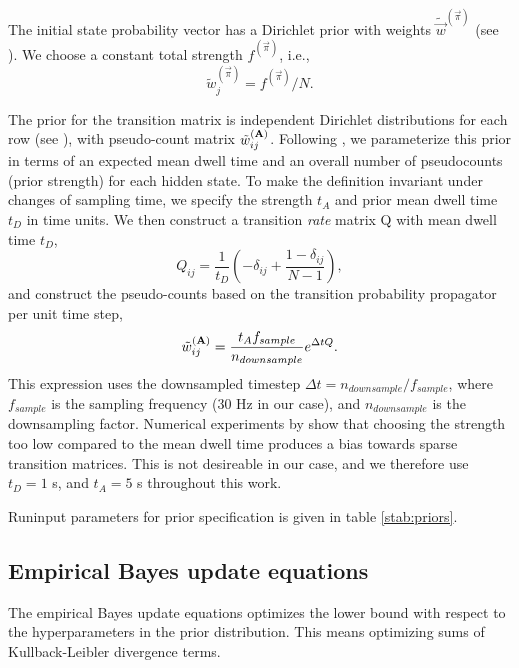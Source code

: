 The initial state probability vector has a Dirichlet prior with
weights $\tilde\vec w^{(\vec{\pi})}$ (see ). We choose a
constant total strength $f^{(\vec\pi)}$, i.e.,
\begin{equation}
  \tilde w_j^{(\vec{\pi})}=f^{(\vec\pi)}/N.
\end{equation}

The prior for the transition matrix is independent Dirichlet
distributions for each row (see ), with pseudo-count
matrix $\tilde w_{ij}^{(\mathbf{A})}$. Following \citet{persson2013},
we parameterize this prior in terms of an expected mean dwell time and
an overall number of pseudocounts (prior strength) for each hidden
state. To make the definition invariant under changes of sampling
time, we specify the strength $t_A$ and prior mean dwell time $t_D$ in
time units. We then construct a transition \textit{rate} matrix Q with
mean dwell time $t_D$,
\begin{equation}
  Q_{ij}=\frac{1}{t_D}\left(-\delta_{ij}
  +\frac{1-\delta_{ij}}{N-1}\right),
\end{equation}
and construct the pseudo-counts based on the transition probability
propagator per unit time step,
\begin{equation}
  \tilde w_{ij}^{(\mathbf{A})}=\frac{t_Af_{sample}}{n_{downsample}}
  e^{\Delta tQ}.
\end{equation}
This expression uses the downsampled timestep $\Delta
t=n_{downsample}/f_{sample}$, where $f_{sample}$ is the sampling
frequency (30 Hz in our case), and $n_{downsample}$ is the
downsampling factor.  Numerical experiments by \citet{persson2013}
show that choosing the strength too low compared to the mean dwell
time produces a bias towards sparse transition matrices. This is not
desireable in our case, and we therefore use $t_D=1$ s, and $t_A=5$ s
throughout this work.

Runinput parameters for prior specification is given in table
\ref{stab:priors}.

\subsection{Empirical Bayes update equations}
The empirical Bayes update equations optimizes the lower bound with
respect to the hyperparameters in the prior distribution. This means
optimizing sums of Kullback-Leibler divergence terms. 

